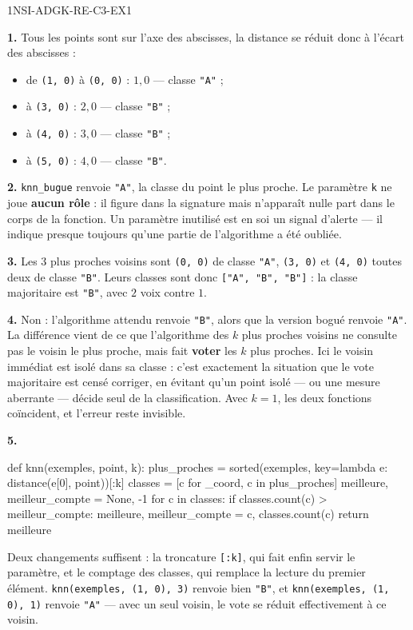 \begin{corrige}{1NSI-ADGK-RE-C3-EX1}

\textbf{1.} Tous les points sont sur l'axe des abscisses, la distance se réduit donc à
l'écart des abscisses :
\begin{itemize}
  \item de \lstinline{(1, 0)} à \lstinline{(0, 0)} : $1{,}0$ — classe \lstinline{"A"} ;
  \item à \lstinline{(3, 0)} : $2{,}0$ — classe \lstinline{"B"} ;
  \item à \lstinline{(4, 0)} : $3{,}0$ — classe \lstinline{"B"} ;
  \item à \lstinline{(5, 0)} : $4{,}0$ — classe \lstinline{"B"}.
\end{itemize}

\textbf{2.} \lstinline{knn_bugue} renvoie \lstinline{"A"}, la classe du point le plus proche.
Le paramètre \lstinline{k} ne joue \textbf{aucun rôle} : il figure dans la signature mais
n'apparaît nulle part dans le corps de la fonction. Un paramètre inutilisé est en soi un
signal d'alerte — il indique presque toujours qu'une partie de l'algorithme a été oubliée.

\textbf{3.} Les $3$ plus proches voisins sont \lstinline{(0, 0)} de classe \lstinline{"A"},
\lstinline{(3, 0)} et \lstinline{(4, 0)} toutes deux de classe \lstinline{"B"}. Leurs
classes sont donc \lstinline{["A", "B", "B"]} : la classe majoritaire est \lstinline{"B"},
avec $2$ voix contre $1$.

\textbf{4.} Non : l'algorithme attendu renvoie \lstinline{"B"}, alors que la version bogué
renvoie \lstinline{"A"}. La différence vient de ce que l'algorithme des $k$ plus proches
voisins ne consulte pas le voisin le plus proche, mais fait \textbf{voter} les $k$ plus
proches. Ici le voisin immédiat est isolé dans sa classe : c'est exactement la situation
que le vote majoritaire est censé corriger, en évitant qu'un point isolé — ou une mesure
aberrante — décide seul de la classification. Avec $k = 1$, les deux fonctions coïncident,
et l'erreur reste invisible.

\textbf{5.}
\begin{python}
def knn(exemples, point, k):
    plus_proches = sorted(exemples, key=lambda e: distance(e[0], point))[:k]
    classes = [c for _coord, c in plus_proches]
    meilleure, meilleur_compte = None, -1
    for c in classes:
        if classes.count(c) > meilleur_compte:
            meilleure, meilleur_compte = c, classes.count(c)
    return meilleure
\end{python}
Deux changements suffisent : la troncature \lstinline{[:k]}, qui fait enfin servir le
paramètre, et le comptage des classes, qui remplace la lecture du premier élément.
\lstinline{knn(exemples, (1, 0), 3)} renvoie bien \lstinline{"B"}, et
\lstinline{knn(exemples, (1, 0), 1)} renvoie \lstinline{"A"} — avec un seul voisin, le vote
se réduit effectivement à ce voisin.

\end{corrige}
